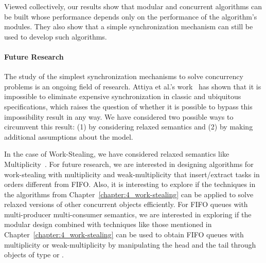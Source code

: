 Viewed collectively, our results show that modular and concurrent algorithms can be built whose performance depends only on the performance of the algorithm's modules. They also show that a simple synchronization mechanism can still be used to develop such algorithms.

\paragraph{Future Research}

The study of the simplest synchronization mechanisms to solve concurrency problems is an ongoing field of research. Attiya et al.'s work~\cite{DBLP_conf_popl_AttiyaGHKMV11} has shown that it is impossible to eliminate expensive synchronization in classic and ubiquitous specifications, which raises the question of whether it is possible to bypass this impossibility result in any way. We have considered two possible ways to circumvent this result: (1) by considering relaxed semantics and (2) by making additional assumptions about the model.

In the case of Work-Stealing, we have considered relaxed semantics like Multiplicity~\cite{DBLP_journals_dc_CastanedaRR23, DBLP_conf_opodis_CastanedaRR20}. For future research, we are interested in designing algorithms for work-stealing with multiplicity and weak-multiplicity that insert/extract tasks in orders different from FIFO. Also, it is interesting to explore if the techniques in the algorithms from Chapter~\ref{chapter:4_work-stealing} can be applied to solve relaxed versions of other concurrent objects efficiently. For FIFO queues with multi-producer multi-consumer semantics, we are interested in exploring if the modular design combined with techniques like those mentioned in Chapter~\ref{chapter:4_work-stealing} can be used to obtain FIFO queues with multiplicity or weak-multiplicity by manipulating the head and the tail through objects of type \MaxR or \RMaxR.





